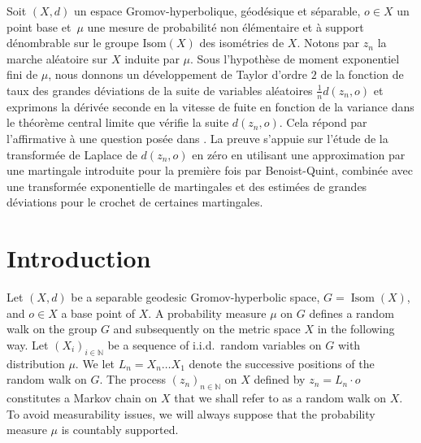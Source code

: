 \documentclass[JEP,XML,SOM,Unicode,published]{cedram}
\theoremstyle{plain}
\theoremstyle{definition}
\newcommand\N{\mathbb{N}}
\DeclareMathOperator\Isom{Isom}
\begin{document}


\begin{altabstract}
Soit $(X,d)$ un espace Gromov-hyperbolique, géodésique et séparable, $o \in X$ un point base et~$\mu$ une mesure de probabilité non élémentaire et à support dénombrable sur le groupe $\mathrm{Isom}(X)$ des isométries de $X$. Notons par $z_n$ la marche aléatoire sur $X$ induite par $\mu$. 
Sous l'hypothèse de moment exponentiel fini de $\mu$, nous donnons un développement de Taylor d'ordre $2$ de la fonction de taux des grandes déviations de la suite de variables aléatoires $\frac{1}{n}d(z_n,o)$ et exprimons la dérivée seconde en la vitesse de fuite en fonction de la variance dans le théorème central limite que vérifie la suite $d(z_n,o)$. Cela répond par l'affirmative à une question posée dans \cite{BMSS}. La preuve s'appuie sur l'étude de la transformée de Laplace de $d(z_n,o)$ en zéro en utilisant une approximation par une martingale introduite pour la première fois par Benoist-Quint, combinée avec une transformée exponentielle de martingales et des estimées de grandes déviations pour le crochet de certaines martingales.
\end{altabstract}
\maketitle

\tableofcontents
\mainmatter

\section{Introduction}
Let $(X,d)$ be a separable geodesic Gromov-hyperbolic space,
$G=\Isom(X)$, and $o \in X$ a base point of $X$. A probability measure $\mu$ on $G$ defines a random walk on the group $G$ and subsequently on the metric space $X$ in the following way. Let $(X_i)_{i\in \N}$ be a sequence of i.i.d.~random variables on $G$ with distribution $\mu$. We let $L_n=X_n \dots X_1$ denote the successive positions of the random walk on $G$. The process $(z_n)_{n \in \N}$ on $X$ defined by $z_n=L_n \cdot o$ constitutes a Markov chain on $X$ that we shall refer to as a random walk on $X$. To avoid measurability issues, we will always suppose that the probability measure $\mu$ is countably supported.
\end{document}
